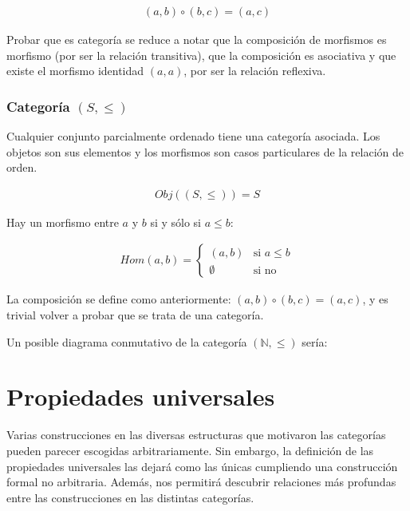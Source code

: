 \documentclass[11pt, fleqn, spanish]{book}
\newcommand{\twopartdef}[4]
{
  \left\{
    \begin{array}{ll}
      #1 & \mbox{si } #2 \\
      #3 & \mbox{si } #4
    \end{array}
  \right.
}
\begin{document}
\begin{align*}
  (a,b) \circ (b,c) = (a,c)
\end{align*}

Probar que es categoría se reduce a notar que la composición de
morfismos es morfismo (por ser la relación transitiva), que la
composición es asociativa y que existe el morfismo identidad $(a,a)$,
por ser la relación reflexiva.
     
\subsection{Categoría \texttt{$(S,\leq)$}}
Cualquier conjunto parcialmente ordenado tiene una categoría asociada. Los objetos
son sus elementos y los morfismos son casos particulares de la relación de orden.

\begin{gather*}
  Obj((S,\leq)) = S
\end{gather*}

Hay un morfismo entre $a$ y $b$ si y sólo si $a \leq b$:

\begin{align*}
  Hom(a,b)= \twopartdef{(a,b)}{a \leq b}{\emptyset}{\mbox{no}}
\end{align*}

La composición se define como anteriormente: $(a,b) \circ (b,c) = (a,c)$, y es
trivial volver a probar que se trata de una categoría.
\medskip

Un posible diagrama conmutativo de la categoría \texttt{$(\mathbb{N},\leq)$} sería:

\begin{center}
\end{center}
 

\chapter{Propiedades universales}
Varias construcciones en las diversas estructuras que motivaron las
categorías pueden parecer escogidas arbitrariamente. Sin embargo, la
definición de las propiedades universales las dejará como las únicas
cumpliendo una construcción formal no arbitraria. Además, nos
permitirá descubrir relaciones más profundas entre las construcciones
en las distintas categorías.
\end{document}
